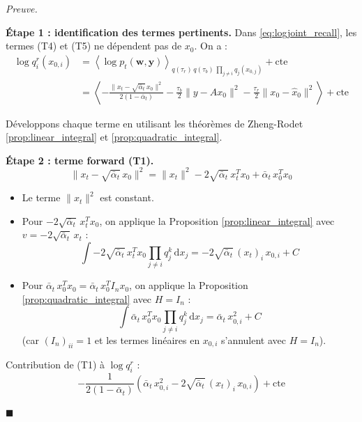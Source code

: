 \documentclass[12pt]{article}
\newcommand{\w}{\boldsymbol{w}}
\newcommand{\y}{\boldsymbol{y}}
\newcommand{\alt}{\bar\alpha_t}
\renewcommand{\qedsymbol}{$\blacksquare$}
\renewenvironment{proof}[1][\proofname]{%
  \par\medskip\noindent
  \textit{\color{proofgray}#1.}\enspace\ignorespaces
}{\hfill\qedsymbol\par\medskip}
\renewcommand{\proofname}{Preuve}
\begin{document}
\begin{proof}

\textbf{Étape 1 : identification des termes pertinents.} Dans \eqref{eq:logjoint_recall}, les termes (T4) et (T5) ne dépendent pas de $x_0$. On a :
\begin{align}
    \log q_i^r(x_{0,i}) &= \left\langle \log p_t(\w, \y) \right\rangle_{q(\tau_r)\, q(\tau_b)\, \prod_{j \neq i} q_j(x_{0,j})} + \mathrm{cte} \nonumber\\[4pt]
    &= \left\langle -\frac{\|x_t - \sqrt{\alt}\, x_0\|^2}{2(1-\alt)} - \frac{\tau_b}{2}\|y - Ax_0\|^2 - \frac{\tau_r}{2}\|x_0 - \hat{x}_0\|^2 \right\rangle + \mathrm{cte}
    \label{eq:log_qr_x0i_start}
\end{align}

Développons chaque terme en utilisant les théorèmes de Zheng-Rodet \ref{prop:linear_integral} et \ref{prop:quadratic_integral}.

\textbf{Étape 2 : terme forward (T1).}
\[
\|x_t - \sqrt{\alt}\, x_0\|^2 = \|x_t\|^2 - 2\sqrt{\alt}\, x_t^T x_0 + \alt\, x_0^T x_0
\]
\begin{itemize}
    \item Le terme $\|x_t\|^2$ est constant.
    \item Pour $-2\sqrt{\alt}\, x_t^T x_0$, on applique la Proposition \ref{prop:linear_integral} avec $v = -2\sqrt{\alt}\, x_t$ :
    \[
    \int -2\sqrt{\alt}\, x_t^T x_0 \prod_{j \neq i} q_j^k\, \mathrm{d}x_j = -2\sqrt{\alt}\, (x_t)_i\, x_{0,i} + C
    \]
    \item Pour $\alt\, x_0^T x_0 = \alt\, x_0^T I_n x_0$, on applique la Proposition \ref{prop:quadratic_integral} avec $H = I_n$ :
    \[
    \int \alt\, x_0^T x_0 \prod_{j \neq i} q_j^k\, \mathrm{d}x_j = \alt\, x_{0,i}^2 + C
    \]
    (car $(I_n)_{ii} = 1$ et les termes linéaires en $x_{0,i}$ s'annulent avec $H = I_n$).
\end{itemize}

Contribution de (T1) à $\log q_i^r$ :
\begin{equation}
    -\frac{1}{2(1-\alt)}\left(\alt\, x_{0,i}^2 - 2\sqrt{\alt}\, (x_t)_i\, x_{0,i}\right) + \mathrm{cte}
    \label{eq:T1_contribution}
\end{equation}


\end{proof}
\end{document}
